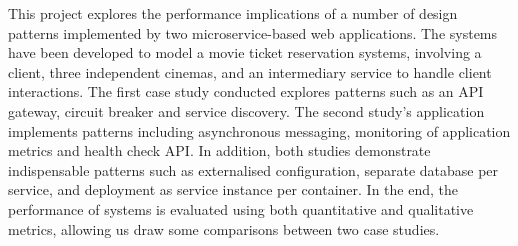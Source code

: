 This project explores the performance implications of a number of design patterns implemented by two microservice-based web applications. The systems have been developed to model a movie ticket reservation systems, involving a client, three independent cinemas, and an intermediary service to handle client interactions. The first case study conducted explores patterns such as an API gateway, circuit breaker and service discovery. The second study's application implements patterns including asynchronous messaging, monitoring of application metrics and health check API. In addition, both studies demonstrate indispensable patterns such as externalised configuration, separate database per service, and deployment as service instance per container. In the end, the performance of systems is evaluated using both quantitative and qualitative metrics, allowing us draw some comparisons between two case studies.

